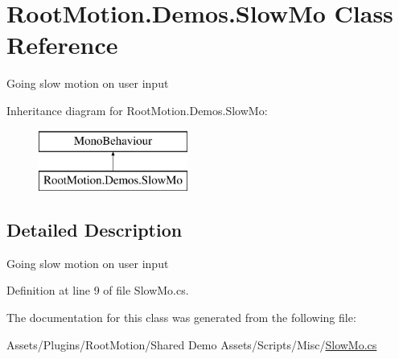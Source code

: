 \hypertarget{class_root_motion_1_1_demos_1_1_slow_mo}{}\section{Root\+Motion.\+Demos.\+Slow\+Mo Class Reference}
\label{class_root_motion_1_1_demos_1_1_slow_mo}


Going slow motion on user input  


Inheritance diagram for Root\+Motion.\+Demos.\+Slow\+Mo\+:\begin{figure}[H]
\begin{center}
\leavevmode
\includegraphics[height=2.000000cm]{class_root_motion_1_1_demos_1_1_slow_mo}
\end{center}
\end{figure}


\subsection{Detailed Description}
Going slow motion on user input 



Definition at line 9 of file Slow\+Mo.\+cs.



The documentation for this class was generated from the following file\+:\begin{DoxyCompactItemize}
\item 
Assets/\+Plugins/\+Root\+Motion/\+Shared Demo Assets/\+Scripts/\+Misc/\mbox{\hyperlink{_slow_mo_8cs}{Slow\+Mo.\+cs}}\end{DoxyCompactItemize}
